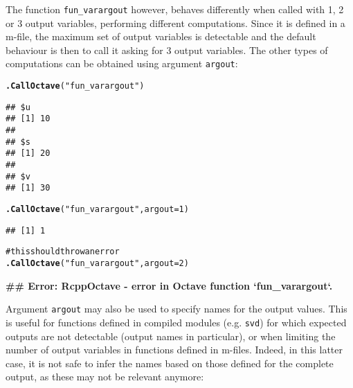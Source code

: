 \documentclass[english,10pt,a4paper]{article}\usepackage{graphicx, color}
\makeatletter
\newcommand{\hlfunctioncall}[1]{\textcolor[rgb]{0.501960784313725,0,0.329411764705882}{\textbf{#1}}}%
\newcommand{\hlstring}[1]{\textcolor[rgb]{0.6,0.6,1}{#1}}%
\newcommand{\hlcomment}[1]{\textcolor[rgb]{0.180392156862745,0.6,0.341176470588235}{#1}}%
\newenvironment{kframe}{%
 \def\at@end@of@kframe{}%
 \ifinner\ifhmode%
  \def\at@end@of@kframe{\end{minipage}}%
  \begin{minipage}{\columnwidth}%
 \fi\fi%
 \def\FrameCommand##1{\hskip\@totalleftmargin \hskip-\fboxsep
 \colorbox{shadecolor}{##1}\hskip-\fboxsep
     \hskip-\linewidth \hskip-\@totalleftmargin \hskip\columnwidth}%
 \MakeFramed {\advance\hsize-\width
   \@totalleftmargin\z@ \linewidth\hsize
   \@setminipage}}%
 {\par\unskip\endMakeFramed%
 \at@end@of@kframe}
\newenvironment{knitrout}{}{} %
\let\code=\texttt
\makeatother
\begin{document}
The function \code{fun\_varargout} however, behaves differently when called
with 1, 2 or 3 output variables, performing different computations.
Since it is defined in a m-file, the maximum set of output variables is
detectable and the default behaviour is then to call it asking for 3 output
variables.
The other types of computations can be obtained using argument \code{argout}:

\begin{knitrout}
\color{fgcolor}\begin{kframe}
\begin{alltt}
\hlfunctioncall{.CallOctave}(\hlstring{"fun_varargout"})
\end{alltt}
\begin{verbatim}
## $u
## [1] 10
## 
## $s
## [1] 20
## 
## $v
## [1] 30
\end{verbatim}
\begin{alltt}
\hlfunctioncall{.CallOctave}(\hlstring{"fun_varargout"}, argout = 1)
\end{alltt}
\begin{verbatim}
## [1] 1
\end{verbatim}
\begin{alltt}
\hlcomment{# this should throw an error}
\hlfunctioncall{.CallOctave}(\hlstring{"fun_varargout"}, argout = 2)
\end{alltt}


{\ttfamily\noindent\bfseries\textcolor{errorcolor}{\#\# Error: RcppOctave - error in Octave function `fun\_varargout`.}}\end{kframe}
\end{knitrout}


Argument \code{argout} may also be used to specify names for the output values.
This is useful for functions defined in compiled modules (e.g. \code{svd}) for
which expected outputs are not detectable (output names in particular), or when
limiting the number of output variables in functions defined in m-files.
Indeed, in this latter case, it is not safe to infer the names based on those
defined for the complete output, as these may not be relevant anymore:
\end{document}
